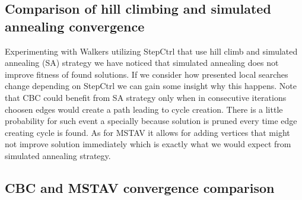 \subsection{Comparison of hill climbing and simulated annealing convergence}
\FloatBarrier
Experimenting with Walkers utilizing StepCtrl that use hill climb and simulated annealing (SA) strategy we have noticed that simulated annealing does not improve fitness of found solutions.
If we consider how presented local searches change depending on StepCtrl we can gain some insight why this happens.
Note that CBC could benefit from SA strategy only when in consecutive iterations choosen edges would create a path leading to cycle creation. There is a little probability for such event a specially because solution is pruned every time edge creating cycle is found. As for MSTAV it allows for adding vertices that might not improve solution immediately which is exactly what we would expect from simulated annealing strategy.

\begin{figure}[hb]

\end{figure}
\begin{figure}[hb]

\end{figure}
\begin{figure}[hb]

\end{figure}
\begin{figure}[hb]

\end{figure}
\begin{figure}[hb]

\end{figure}
\begin{figure}[hb]

\end{figure}
\begin{figure}[hb]

\end{figure}
\begin{figure}[hb]

\end{figure}
\FloatBarrier

\subsection{CBC and MSTAV convergence comparison}
\FloatBarrier

